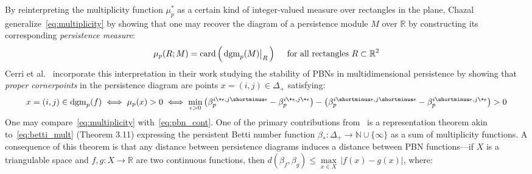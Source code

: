 By reinterpreting the multiplicity function $\mu^\ast_p$ as a certain kind of integer-valued measure over rectangles in the plane, Chazal~\cite{chazal2016structure} generalize~\eqref{eq:multiplicity} 
by showing that one may recover the diagram of a persistence module $M$ over $\mathbb{R}$ by constructing its corresponding \emph{persistence measure}:
\begin{equation}\label{eq:measure}
	\mu_p(R; M) = \mathrm{card}\left( \,
	\restr{\mathrm{dgm}_p(M)}{R} \,
	\right) \quad \text{ for all rectangles } R \subset \mathbb{R}^2 
\end{equation}
Cerri et al.~\cite{cerri2013betti} incorporate this interpretation in their work studying the stability of PBNs in multidimensional persistence by showing that \emph{proper cornerpoints} in the persistence diagram are points $x = (i,j) \in \Delta_+$ satisfying:
\begin{equation}\label{eq:pbn_cont}
	x = (i,j) \in \mathrm{dgm}_p(f) \; \Longleftrightarrow \; \mu_p(x) > 0 \; \Longleftrightarrow \; \min_{\epsilon > 0} \left(\beta_p^{i \+ \epsilon, j \shortminus \epsilon} - \beta_p^{i \+ \epsilon, j \+ \epsilon} \right) - \left(\beta_p^{i \shortminus \epsilon, j \shortminus \epsilon} - \beta_p^{i \shortminus \epsilon, j \+ \epsilon} \right) > 0
\end{equation}
One may compare~\eqref{eq:multiplicity} with~\eqref{eq:pbn_cont}. One of the primary contributions from~\cite{cerri2013betti} is a representation theorem akin to~\eqref{eq:betti_mult} (Theorem 3.11) expressing the persistent Betti number function $\beta_\ast : \Delta_+ \to \mathbb{N}\cup \{\infty\}$ as a sum of multiplicity functions. 
A consequence of this theorem is that any distance between persistence diagrams induces a distance between PBN functions---if $X$ is a triangulable space and $f,g : X \to \mathbb{R}$ are two continuous functions, then $d(\beta_f, \beta_g) \leq \max\limits_{x \in X} \, \lvert f(x) - g(x) \rvert$, where:
